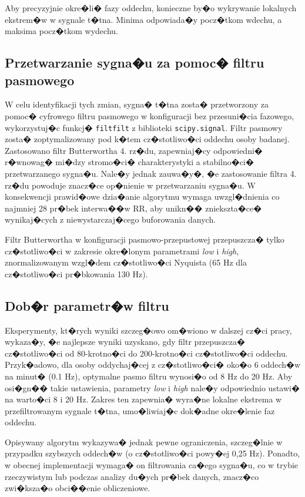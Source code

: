 Aby precyzyjnie okre�li� fazy oddechu, konieczne by�o wykrywanie lokalnych
ekstrem�w w sygnale t�tna. Minima odpowiada�y pocz�tkom wdechu, a maksima
pocz�tkom wydechu.

\subsection{Przetwarzanie sygna�u za pomoc� filtru pasmowego}
W celu identyfikacji tych zmian, sygna� t�tna zosta� przetworzony za pomoc�
cyfrowego filtru pasmowego w konfiguracji bez przesuni�cia fazowego,
wykorzystuj�c funkcj� \texttt{filtfilt} z biblioteki \texttt{scipy.signal}.
Filtr pasmowy zosta� zoptymalizowany pod k�tem cz�stotliwo�ci oddechu osoby
badanej. Zastosowano filtr Butterwortha 4. rz�du, zapewniaj�cy odpowiedni�
r�wnowag� mi�dzy stromo�ci� charakterystyki a stabilno�ci� przetwarzanego
sygna�u. Nale�y jednak zauwa�y�, �e zastosowanie filtra 4. rz�du powoduje
znacz�ce op�nienie w przetwarzaniu sygna�u. W konsekwencji prawid�owe dzia�anie
algorytmu wymaga uwzgl�dnienia co najmniej 28 pr�bek interwa��w RR, aby unikn��
zniekszta�ce� wynikaj�cych z niewystarczaj�cego buforowania danych.

Filtr Butterwortha w konfiguracji pasmowo-przepustowej przepuszcza� tylko
cz�stotliwo�ci w zakresie okre�lonym parametrami \textit{low} i \textit{high},
znormalizowanym wzgl�dem cz�stotliwo�ci Nyquista (65 Hz dla cz�stotliwo�ci
pr�bkowania 130 Hz).

\subsection{Dob�r parametr�w filtru}
Eksperymenty, kt�rych wyniki szczeg�owo om�wiono w dalszej cz�ci pracy,
wykaza�y, �e najlepsze wyniki uzyskano, gdy filtr przepuszcza� cz�stotliwo�ci
od 80-krotno�ci do 200-krotno�ci cz�stotliwo�ci oddechu. Przyk�adowo, dla osoby
oddychaj�cej z cz�stotliwo�ci� oko�o 6 oddech�w na minut� (0.1 Hz), optymalne
pasmo filtru wynosi�o od 8 Hz do 20 Hz. Aby osi�gn�� takie ustawienia,
parametry \textit{low} i \textit{high} nale�y odpowiednio ustawi� na warto�ci 8
i 20 Hz. Zakres ten zapewnia� wyra�ne lokalne ekstrema w przefiltrowanym
sygnale t�tna, umo�liwiaj�c dok�adne okre�lenie faz oddechu.

Opisywany algorytm wykazywa� jednak pewne ograniczenia, szczeg�lnie w przypadku
szybszych oddech�w (o cz�stotliwo�ci powy�ej 0,25 Hz). Ponadto, w obecnej
implementacji wymaga� on filtrowania ca�ego sygna�u, co w trybie rzeczywistym
lub podczas analizy du�ych pr�bek danych, znacz�co zwi�ksza�o obci��enie
obliczeniowe.

